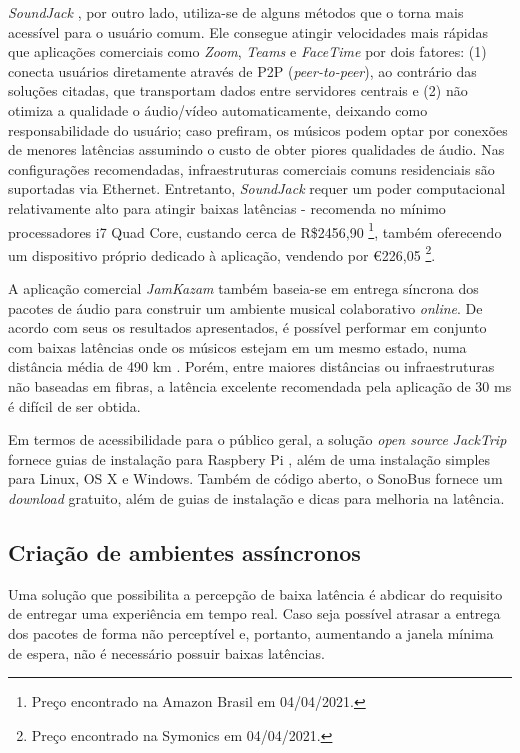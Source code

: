 \textit{SoundJack} \cite{soundjack}, por outro lado, utiliza-se de alguns métodos que o torna mais acessível para o usuário comum. Ele consegue atingir velocidades mais rápidas que aplicações comerciais como \textit{Zoom}, \textit{Teams} e \textit{FaceTime} por dois fatores: (1) conecta usuários diretamente através de P2P (\textit{peer-to-peer}), ao contrário das soluções citadas, que transportam dados entre servidores centrais e (2) não otimiza a qualidade o áudio/vídeo automaticamente, deixando como responsabilidade do usuário; caso prefiram, os músicos podem optar por conexões de menores latências assumindo o custo de obter piores qualidades de áudio. Nas configurações recomendadas, infraestruturas comerciais comuns residenciais são suportadas via Ethernet. Entretanto, \textit{SoundJack} requer um poder computacional relativamente alto para atingir baixas latências - recomenda no mínimo processadores i7 Quad Core, custando cerca de R\$2456,90 \footnote{Preço encontrado na Amazon Brasil em 04/04/2021.}, também oferecendo um dispositivo próprio dedicado à aplicação, vendendo por €226,05 \footnote{Preço encontrado na Symonics em 04/04/2021.}.

A aplicação comercial \textit{JamKazam} \cite{jamkazam} também baseia-se em entrega síncrona dos pacotes de áudio para construir um ambiente musical colaborativo \textit{online}. De acordo com seus os resultados apresentados, é possível performar em conjunto com baixas latências onde os músicos estejam em um mesmo estado, numa distância média de 490 km \cite{jamkazam_video}. Porém, entre maiores distâncias ou infraestruturas não baseadas em fibras, a latência excelente recomendada pela aplicação de 30 ms \cite{jamkazam_latencies} é difícil de ser obtida.

Em termos de acessibilidade para o público geral, a solução \textit{open source} \textit{JackTrip} fornece guias de instalação para Raspbery Pi \cite{jacktrip_rasp}, além de uma instalação simples para Linux, OS X e Windows. Também de código aberto, o SonoBus \cite{sonobus} fornece um \textit{download} gratuito, além de guias de instalação e dicas para melhoria na latência.

\subsection{Criação de ambientes assíncronos}

Uma solução que possibilita a percepção de baixa latência é abdicar do requisito de entregar uma experiência em tempo real. Caso seja possível atrasar a entrega dos pacotes de forma não perceptível e, portanto, aumentando a janela mínima de espera, não é necessário possuir baixas latências.

